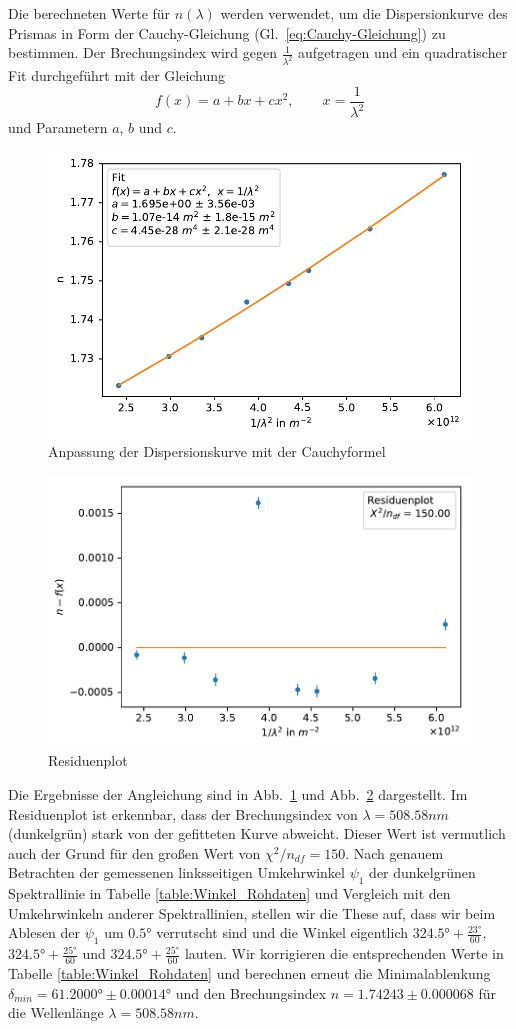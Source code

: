 \documentclass[12pt,a4paper]{article}
\begin{document}
Die berechneten Werte für $n(\lambda)$ werden verwendet, um die Dispersionkurve des Prismas in Form der Cauchy-Gleichung (Gl.~\eqref{eq:Cauchy-Gleichung}) zu bestimmen. Der Brechungsindex wird gegen $\frac{1}{\lambda^2}$ aufgetragen und ein quadratischer Fit durchgeführt mit der Gleichung
\begin{equation}\label{fitfunktion}
f(x)=a+bx+cx^2,\qquad x=\frac{1}{\lambda^2}
\end{equation}
und Parametern $a$, $b$ und $c$.\\
\begin{figure}[H]
	\centering
	\includegraphics[width=0.7\linewidth]{Python/CdHg_LinReg_Messfehler.pdf}
	\caption{Anpassung der Dispersionskurve mit der Cauchyformel}
	\label{CdHg_LinReg_Messfehler}
\end{figure}
\begin{figure}[H]
	\centering
	\includegraphics[width=0.7\linewidth]{Python/CdHg_Residuen_Messfehler.pdf}
	\caption{Residuenplot}
	\label{CdHg_Residuenplot_Messfehler}
\end{figure}
Die Ergebnisse der Angleichung sind in Abb.~\ref{CdHg_LinReg_Messfehler} und Abb.~\ref{CdHg_Residuenplot_Messfehler} dargestellt. Im Residuenplot ist erkennbar, dass der Brechungsindex von $\lambda=508.58nm$ (dunkelgrün) stark von der gefitteten Kurve abweicht. Dieser Wert ist vermutlich auch der Grund für den großen Wert von $\chi^2/n_{df}=150$. Nach genauem Betrachten der gemessenen linksseitigen Umkehrwinkel $\psi_1$ der dunkelgrünen Spektrallinie in Tabelle \ref{table:Winkel_Rohdaten} und Vergleich mit den Umkehrwinkeln anderer Spektrallinien, stellen wir die These auf, dass wir beim Ablesen der $\psi_1$ um $\ang{0.5}$ verrutscht sind und die Winkel eigentlich $\ang{324.5}+\frac{\ang{23}}{60}$, $\ang{324.5}+\frac{\ang{25}}{60}$ und $\ang{324.5}+\frac{\ang{25}}{60}$ lauten. Wir korrigieren die entsprechenden Werte in Tabelle \ref{table:Winkel_Rohdaten} und berechnen erneut die Minimalablenkung $\delta_{min}=\ang{61.2000}\pm\ang{0.00014}$ und den Brechungsindex $n=1.74243\pm0.000068$ für die Wellenlänge $\lambda=508.58nm$.\\
\end{document}
